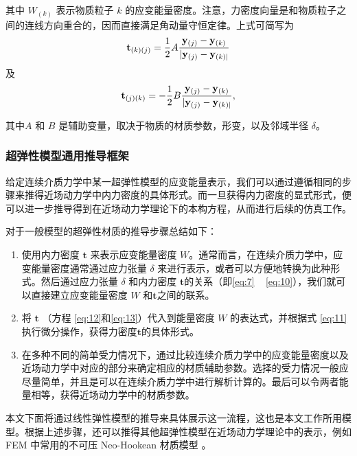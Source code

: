 其中 $W_{(k)}$ 表示物质粒子 $k$ 的应变能量密度。注意，力密度向量是和物质粒子之间的连线方向重合的，因而直接满足角动量守恒定律。上式可简写为
\begin{equation}
\mathbf{t}_{(k)(j)} = \frac{1}{2}A\frac{\mathbf{y}_{(j)}-\mathbf{y}_{(k)}}{|\mathbf{y}_{(j)}-\mathbf{y}_{(k)|}}
\label{eq:12}
\end{equation}
及
\begin{equation}
\mathbf{t}_{(j)(k)} = -\frac{1}{2}B\frac{\mathbf{y}_{(j)}-\mathbf{y}_{(k)}}{|\mathbf{y}_{(j)}-\mathbf{y}_{(k)|}},
\label{eq:13}
\end{equation}

其中$A$ 和 $B$ 是辅助变量，取决于物质的材质参数，形变，以及邻域半径 $\delta$。

\subsubsection{超弹性模型通用推导框架}
给定连续介质力学中某一超弹性模型的应变能量表示，我们可以通过遵循相同的步骤来推得近场动力学中内力密度的具体形式。而一旦获得内力密度的显式形式，便可以进一步推导得到在近场动力学理论下的本构方程，从而进行后续的仿真工作。

对于一般模型的超弹性材质的推导步骤总结如下：
\begin{enumerate}
  \item 使用内力密度 $\mathbf{t}$ 来表示应变能量密度 $W$。通常而言，在连续介质力学中，应变能量密度通常通过应力张量 $\delta$ 来进行表示，或者可以方便地转换为此种形式。然后通过应力张量 $\delta$ 和内力密度 $\mathbf{t}$的关系（即\ref{eq:7} ~ \ref{eq:10}），我们就可以直接建立应变能量密度 $W$ 和$\mathbf{t}$之间的联系。
  \item 将 $\mathbf{t}$ （方程 \ref{eq:12}和\ref{eq:13}）代入到能量密度 $W$ 的表达式，并根据式 \ref{eq:11} 执行微分操作，获得力密度$\mathbf{t}$的具体形式。
  \item 在多种不同的简单受力情况下，通过比较连续介质力学中的应变能量密度以及近场动力学中对应的部分来确定相应的材质辅助参数。选择的受力情况一般应尽量简单，并且是可以在连续介质力学中进行解析计算的。最后可以令两者能量相等，获得近场动力学中的材质参数。
\end{enumerate}

本文下面将通过线性弹性模型的推导来具体展示这一流程，这也是本文工作所用模型。根据上述步骤，还可以推得其他超弹性模型在近场动力学理论中的表示，例如 FEM 中常用的不可压 Neo-Hookean 材质模型 。

